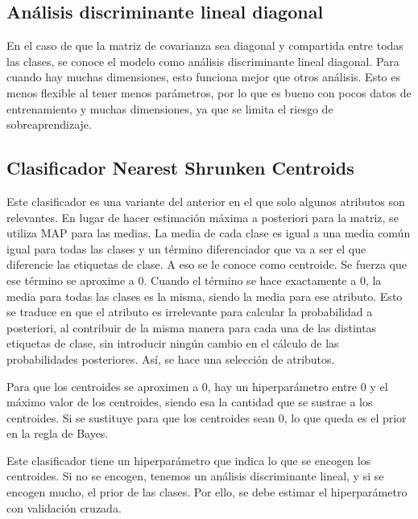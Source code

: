 \subsection{Análisis discriminante lineal diagonal}
En el caso de que la matriz de covarianza sea diagonal y compartida entre todas las clases, se conoce el modelo como análisis discriminante lineal diagonal. Para cuando hay muchas dimensiones, esto funciona mejor que otros análisis. Esto es menos flexible al tener menos parámetros, por lo que es bueno con pocos datos de entrenamiento y muchas dimensiones, ya que se limita el riesgo de sobreaprendizaje.

\subsection{Clasificador Nearest Shrunken Centroids}
Este clasificador es una variante del anterior en el que solo algunos atributos son relevantes. En lugar de hacer estimación máxima a posteriori para la matriz, se utiliza MAP para las medias. La media de cada clase es igual a una media común igual para todas las clases y un término diferenciador que va a ser el que diferencie las etiquetas de clase. A eso se le conoce como centroide. Se fuerza que ese término se aproxime a 0. Cuando el término se hace exactamente a 0, la media para todas las clases es la misma, siendo la media para ese atributo. Esto se traduce en que el atributo es irrelevante para calcular la probabilidad a posteriori, al contribuir de la misma manera para cada una de las distintas etiquetas de clase, sin introducir ningún cambio en el cálculo de las probabilidades posteriores. Así, se hace una selección de atributos. 

Para que los centroides se aproximen a 0, hay un hiperparámetro entre 0 y el máximo valor de los centroides, siendo esa la cantidad que se sustrae a los centroides. Si se sustituye para que los centroides sean 0, lo que queda es el prior en la regla de Bayes. 

Este clasificador tiene un hiperparámetro que indica lo que se encogen los centroides. Si no se encogen, tenemos un análisis discriminante lineal, y si se encogen mucho, el prior de las clases. Por ello, se debe estimar el hiperparámetro con validación cruzada.  

